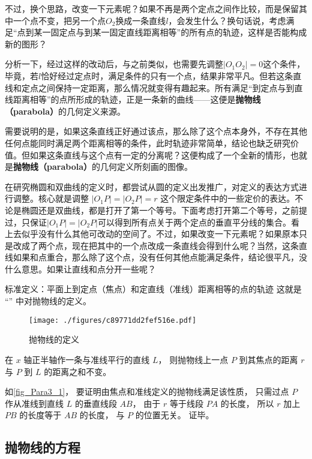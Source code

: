 不过，换个思路，改变一下元素呢？如果不再是两个定点之间作比较，而是保留其中一个点不变，把另一个点$O_2$换成一条直线$l$，会发生什么？换句话说，考虑满足“点到某一固定点与到某一固定直线距离相等”的所有点的轨迹，这样是否能构成新的图形？

分析一下，经过这样的改动后，与之前类似，也需要先调整$|O_1O_2|=0$这个条件，毕竟，若$l$恰好经过定点时，满足条件的只有一个点，结果非常平凡。但若这条直线和定点之间保持一定距离，那么情况就变得有趣起来。所有满足“到定点与到直线距离相等”的点所形成的轨迹，正是一条新的曲线——这便是\textbf{抛物线（parabola）}的几何定义来源。


需要说明的是，如果这条直线正好通过该点，那么除了这个点本身外，不存在其他任何点能同时满足两个距离相等的条件，此时轨迹非常简单，结论也缺乏研究价值。但如果这条直线与这个点有一定的分离呢？这便构成了一个全新的情形，也就是\textbf{抛物线（parabola）}的几何定义所刻画的图像。


在研究椭圆和双曲线的定义时，都尝试从圆的定义出发推广，对定义的表达方式进行调整。核心就是调整 $|O_1P| = |O_2P| = r$ 这个限定条件中的一些定价的表达。不论是椭圆还是双曲线，都是打开了第一个等号。下面考虑打开第二个等号，之前提过，只保证$|O_1P| = |O_2P|$可以得到所有点关于两个定点的垂直平分线的集合。看上去似乎没有什么其他可改动的空间了。不过，如果改变一下元素呢？如果原本只是改成了两个点，现在把其中的一个点改成一条直线会得到什么呢？当然，这条直线如果和点重合，那么除了这个点，没有任何其他点能满足条件，结论很平凡，没什么意思。如果让直线和点分开一些呢？



标准定义：平面上到定点（焦点）和定直线（准线）距离相等的点的轨迹
这就是 “” 中对抛物线的定义。
\begin{figure}[ht]
\centering
\texttt{[image: ./figures/c89771dd2fef516e.pdf]}
\caption{抛物线的定义} \label{fig_Para3_1}
\end{figure}

在 $x$ 轴正半轴作一条与准线平行的直线 $L$， 则抛物线上一点 $P$ 到其焦点的距离 $r$ 与 $P$ 到 $L$ 的距离之和不变。

如\autoref{fig_Para3_1}， 要证明由焦点和准线定义的抛物线满足该性质， 只需过点 $P$ 作从准线到直线 $L$ 的垂直线段 $AB$， 由于 $r$ 等于线段 $PA$ 的长度， 所以 $r$ 加上 $PB$ 的长度等于 $AB$ 的长度， 与 $P$ 的位置无关。 证毕。


\subsection{抛物线的方程}

